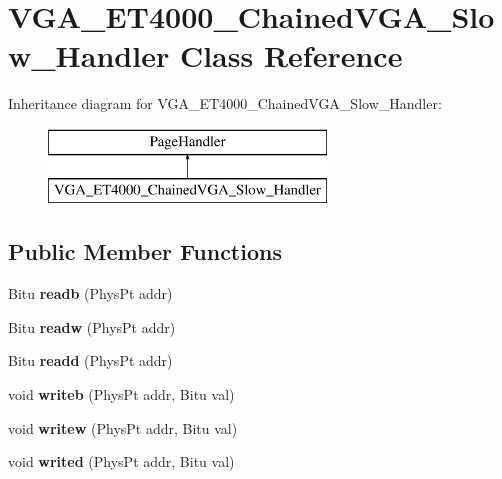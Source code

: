 \hypertarget{classVGA__ET4000__ChainedVGA__Slow__Handler}{\section{V\-G\-A\-\_\-\-E\-T4000\-\_\-\-Chained\-V\-G\-A\-\_\-\-Slow\-\_\-\-Handler Class Reference}
\label{classVGA__ET4000__ChainedVGA__Slow__Handler}
}
Inheritance diagram for V\-G\-A\-\_\-\-E\-T4000\-\_\-\-Chained\-V\-G\-A\-\_\-\-Slow\-\_\-\-Handler\-:\begin{figure}[H]
\begin{center}
\leavevmode
\includegraphics[height=2.000000cm]{classVGA__ET4000__ChainedVGA__Slow__Handler}
\end{center}
\end{figure}
\subsection*{Public Member Functions}
\begin{DoxyCompactItemize}
\item 
\hypertarget{classVGA__ET4000__ChainedVGA__Slow__Handler_a8539165a8112a08e6072704e2020d647}{Bitu {\bfseries readb} (Phys\-Pt addr)}\label{classVGA__ET4000__ChainedVGA__Slow__Handler_a8539165a8112a08e6072704e2020d647}

\item 
\hypertarget{classVGA__ET4000__ChainedVGA__Slow__Handler_accc80a7ac60e95e79a5c69018283cd1d}{Bitu {\bfseries readw} (Phys\-Pt addr)}\label{classVGA__ET4000__ChainedVGA__Slow__Handler_accc80a7ac60e95e79a5c69018283cd1d}

\item 
\hypertarget{classVGA__ET4000__ChainedVGA__Slow__Handler_abed35aa17e8522f2daf28a8901f1e8df}{Bitu {\bfseries readd} (Phys\-Pt addr)}\label{classVGA__ET4000__ChainedVGA__Slow__Handler_abed35aa17e8522f2daf28a8901f1e8df}

\item 
\hypertarget{classVGA__ET4000__ChainedVGA__Slow__Handler_a284da74a4dc51fa624a528329930e40a}{void {\bfseries writeb} (Phys\-Pt addr, Bitu val)}\label{classVGA__ET4000__ChainedVGA__Slow__Handler_a284da74a4dc51fa624a528329930e40a}

\item 
\hypertarget{classVGA__ET4000__ChainedVGA__Slow__Handler_a03a0a2f1bda2b7461d6b5f3c244e1535}{void {\bfseries writew} (Phys\-Pt addr, Bitu val)}\label{classVGA__ET4000__ChainedVGA__Slow__Handler_a03a0a2f1bda2b7461d6b5f3c244e1535}

\item 
\hypertarget{classVGA__ET4000__ChainedVGA__Slow__Handler_a6c6d931c871886971cb0c88252185134}{void {\bfseries writed} (Phys\-Pt addr, Bitu val)}\label{classVGA__ET4000__ChainedVGA__Slow__Handler_a6c6d931c871886971cb0c88252185134}

\end{DoxyCompactItemize}
